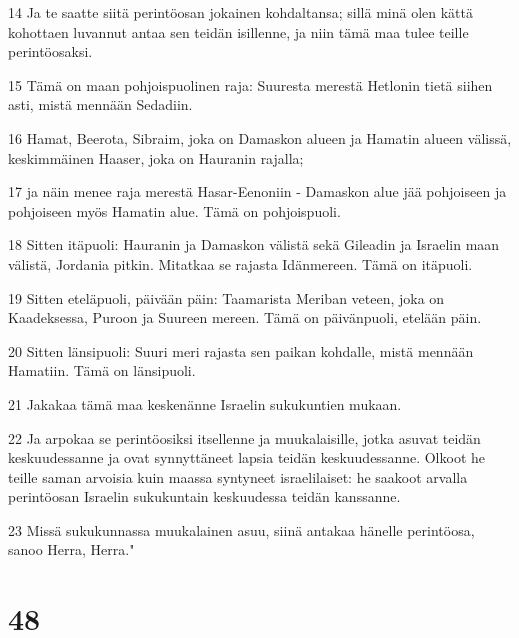 \par 14 Ja te saatte siitä perintöosan jokainen kohdaltansa; sillä minä olen kättä kohottaen luvannut antaa sen teidän isillenne, ja niin tämä maa tulee teille perintöosaksi.
\par 15 Tämä on maan pohjoispuolinen raja: Suuresta merestä Hetlonin tietä siihen asti, mistä mennään Sedadiin.
\par 16 Hamat, Beerota, Sibraim, joka on Damaskon alueen ja Hamatin alueen välissä, keskimmäinen Haaser, joka on Hauranin rajalla;
\par 17 ja näin menee raja merestä Hasar-Eenoniin - Damaskon alue jää pohjoiseen ja pohjoiseen myös Hamatin alue. Tämä on pohjoispuoli.
\par 18 Sitten itäpuoli: Hauranin ja Damaskon välistä sekä Gileadin ja Israelin maan välistä, Jordania pitkin. Mitatkaa se rajasta Idänmereen. Tämä on itäpuoli.
\par 19 Sitten eteläpuoli, päivään päin: Taamarista Meriban veteen, joka on Kaadeksessa, Puroon ja Suureen mereen. Tämä on päivänpuoli, etelään päin.
\par 20 Sitten länsipuoli: Suuri meri rajasta sen paikan kohdalle, mistä mennään Hamatiin. Tämä on länsipuoli.
\par 21 Jakakaa tämä maa keskenänne Israelin sukukuntien mukaan.
\par 22 Ja arpokaa se perintöosiksi itsellenne ja muukalaisille, jotka asuvat teidän keskuudessanne ja ovat synnyttäneet lapsia teidän keskuudessanne. Olkoot he teille saman arvoisia kuin maassa syntyneet israelilaiset: he saakoot arvalla perintöosan Israelin sukukuntain keskuudessa teidän kanssanne.
\par 23 Missä sukukunnassa muukalainen asuu, siinä antakaa hänelle perintöosa, sanoo Herra, Herra."

\chapter{48}

